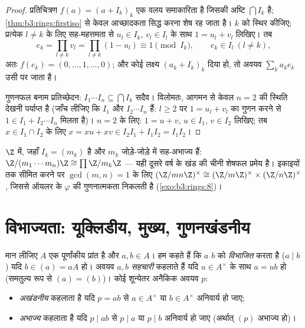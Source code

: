 \begin{proof}
प्रतिचित्रण $f(a) = (a + I_k)_k$ एक वलय समाकारिता है जिसकी अष्टि $\bigcap I_k$ है;
\cref{thm:b3:rings:firstiso} से केवल आच्छादकता सिद्ध करना शेष रह जाता है। $k$ को स्थिर
कीजिए; प्रत्येक $l \neq k$ के लिए सह-महत्तमता से $u_l \in I_k$, $v_l \in I_l$ के साथ
$1 = u_l +
v_l$ लिखिए। तब
\[
e_k = \prod_{l \neq k} v_l = \prod_{l\neq k}(1 - u_l)
\equiv 1 \pmod{I_k},
\qquad e_k \in I_l \ (l \neq k),
\]
अतः $f(e_k) = (0, \dots, 1, \dots, 0)$; और कोई लक्ष्य $(a_k +
I_k)_k$ दिया हो, तो अवयव $\sum_k a_k e_k$ उसी पर
जाता है।

गुणनफल बनाम प्रतिच्छेदन: $I_1\cdots I_n \subseteq \bigcap I_k$ सदैव। विलोमतः, आगमन से केवल
$n = 2$ की स्थिति देखनी पर्याप्त है (जाँच लीजिए कि $I_1$ और $I_2\cdots I_n$
 हैं: $l \geq 2$ पर $1 = u_l + v_l$ का गुणन करने से $1 \in I_1 + I_2\cdots
I_n$ मिलता है)।
$n = 2$ के लिए: $1 = u + v$, $u \in I_1$, $v \in I_2$ लिखिए; तब $x \in I_1 \cap I_2$ के लिए $x = xu + xv \in I_2I_1 + I_1I_2 =
I_1I_2$।
\end{proof}

\begin{example}\label{ex:b3:rings:crtz}
$\Z$ में, जहाँ $I_k = (m_k)$ है और $m_k$ जोड़े-जोड़े में सह-अभाज्य हैं:
$\Z/(m_1\cdots
m_n)\Z \cong \prod \Z/m_k\Z$ --- यही दूसरे वर्ष के खंड की चीनी शेषफल प्रमेय है। इकाइयों
तक सीमित करने पर $\gcd(m,n)=1$ के लिए $(\Z/mn\Z)^\times \cong
(\Z/m\Z)^\times \times (\Z/n\Z)^\times$, जिससे ऑयलर के $\varphi$ की
गुणनात्मकता निकलती है (\cref{exo:b3:rings:8})।
\end{example}

\section{विभाज्यता: यूक्लिडीय, मुख्य, गुणनखंडनीय}

\begin{definition}\label{def:b3:rings:divisibility}
मान लीजिए $A$ एक पूर्णांकीय प्रांत है और $a, b \in A$। हम कहते हैं कि
$a$ $b$ को \emph{विभाजित} करता है ($a \mid b$) यदि $b \in (a) = aA$ हो। अवयव
$a,
b$ \emph{सहचारी} कहलाते हैं यदि $u \in A^\times$ के
साथ $a = ub$ हो (समतुल्य रूप से $(a) = (b)$)। कोई शून्येतर अनैकिक अवयव
$p$:
\begin{itemize}
  \item \emph{अखंडनीय} कहलाता है यदि $p = ab$
        से $a \in A^\times$ या $b \in A^\times$ अनिवार्य हो जाए;
  \item \emph{अभाज्य} कहलाता है यदि $p \mid ab$ से
        $p
        \mid a$ या $p \mid b$ अनिवार्य हो जाए (अर्थात्  $(p)$
        अभाज्य हो)।
\end{itemize}
\end{definition}


